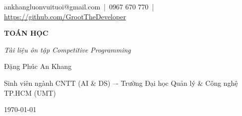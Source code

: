 \begin{titlepage}
\thispagestyle{empty}
\centering

\vspace*{1cm}

{\large ankhangluonvuituoi@gmail.com \,|\, 0967 670 770 \,|\, \url{https://github.com/GrootTheDeveloper}}\\[3.5cm]

{\fontsize{36}{40}\selectfont\bfseries TOÁN HỌC\par} 
\vspace{0.6cm}
{\fontsize{18}{22}\selectfont\itshape Tài liệu ôn tập Competitive Programming \par}
\vspace{5cm}

{\Large Đặng Phúc An Khang\par}
\vspace{0.4cm}
{\large Sinh viên ngành CNTT (AI \& DS) –- Trường Đại học Quản lý \& Công nghệ TP.HCM (UMT)\par}
\vspace{1.2cm}

\vspace{10cm}

{\Large \today\par}

\vfill
\end{titlepage}
